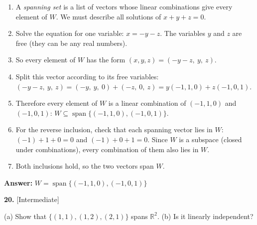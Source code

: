 \documentclass[11pt]{article}
\begin{document}
\begin{tcolorbox}[breakable,colback=ans,colframe=ansb,boxrule=0.5pt,left=4pt,right=4pt,top=2pt,bottom=2pt]\begin{enumerate}[leftmargin=2.2em,itemsep=1pt,topsep=1pt,label=\textbf{Step \arabic*.}]\item A \emph{spanning set} is a list of vectors whose linear combinations give every element of $W$. We must describe all solutions of $x+y+z=0$.
\item Solve the equation for one variable: $x=-y-z$. The variables $y$ and $z$ are free (they can be any real numbers).
\item So every element of $W$ has the form $(x,y,z)=(-y-z,\ y,\ z)$.
\item Split this vector according to its free variables: $(-y-z,\ y,\ z)=(-y,\ y,\ 0)+(-z,\ 0,\ z)=y(-1,1,0)+z(-1,0,1)$.
\item Therefore every element of $W$ is a linear combination of $(-1,1,0)$ and $(-1,0,1)$: $W\subseteq\operatorname{span}\{(-1,1,0),(-1,0,1)\}$.
\item For the reverse inclusion, check that each spanning vector lies in $W$: $(-1)+1+0=0$ and $(-1)+0+1=0$. Since $W$ is a subspace (closed under combinations), every combination of them also lies in $W$.
\item Both inclusions hold, so the two vectors span $W$.
\end{enumerate}\textbf{Answer:} $W=\operatorname{span}\{(-1,1,0),(-1,0,1)\}$\end{tcolorbox}
\par\vspace{2pt}
\begin{minipage}{\linewidth}\textbf{20.} \hfill{\scriptsize\color{ink}[Intermediate]}\par\nopagebreak (a) Show that $\{(1,1),(1,2),(2,1)\}$ spans $\mathbb{R}^{2}$. (b) Is it linearly independent?
\end{minipage}\par\nopagebreak
\end{document}
